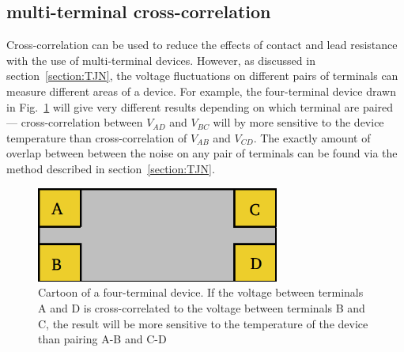 \subsection{multi-terminal cross-correlation}
Cross-correlation can be used to reduce the effects of contact and lead resistance with the use of multi-terminal devices. However, as discussed in section~\ref{section:TJN}, the voltage fluctuations on different pairs of terminals can measure different areas of a device. For example, the four-terminal device drawn in Fig.~\ref{fig:4terminal} will give very different results depending on which terminal are paired --- cross-correlation between $V_{AD}$ and $V_{BC}$ will by more sensitive to the device temperature than cross-correlation of $V_{AB}$ and $V_{CD}$. The exactly amount of overlap between between the noise on any pair of terminals can be found via the method described in section~\ref{section:TJN}.
\begin{figure}
\centering
\includegraphics[width=80mm]{figures/Johnson_noise_thermometry/4terminal.png}
\caption{Cartoon of a four-terminal device. If the voltage between terminals A and D is cross-correlated to the voltage between terminals B and C, the result will be more sensitive to the temperature of the device than pairing A-B and C-D}
\label{fig:4terminal}
\end{figure}

